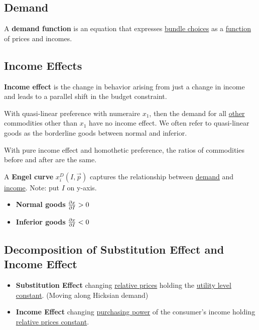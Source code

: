 \documentclass[]{article}
\begin{document}
        \subsection{Demand}
            \begin{definition}
                A \textbf{demand function} is an equation that expresses \ul{bundle choices} as a \ul{function} of prices and incomes.
            \end{definition}
            
        \subsection{Income Effects}
            \begin{definition}
                \textbf{Income effect} is the change in behavior arising from just a change in income and leads to a parallel shift in the budget constraint.
            \end{definition}
            
            \begin{remark}
                With quasi-linear preference with numeraire $x_1$, then the demand for all \ul{other} commodities other than $x_1$ have no income effect. We often refer to quasi-linear goods as the borderline goods between normal and inferior.
            \end{remark}
            
            \begin{remark}
                With pure income effect and homothetic preference, the ratios of commodities before and after are the same.
            \end{remark}
            
            \begin{definition}
                A \textbf{Engel curve} $x_i^D(I, \vec{p})$ captures the relationship between \ul{demand} and \ul{income}. Note: put $I$ on y-axis.
            \end{definition}
            
            \begin{itemize}
                \item \textbf{Normal goods} $\frac{\partial{x}}{\partial{I}} > 0$
                \item \textbf{Inferior goods} $\frac{\partial{x}}{\partial{I}} < 0$
            \end{itemize}
            
        \subsection{Decomposition of Substitution Effect and Income Effect}
            \begin{itemize}
                \item \textbf{Substitution Effect} changing \ul{relative prices} holding the \ul{utility level constant}. (Moving along Hicksian demand)
                \item \textbf{Income Effect} changing \ul{purchasing power} of the consumer's income holding 
                \ul{relative prices constant}.
            \end{itemize}
            
\end{document}
